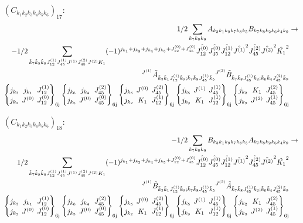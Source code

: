 \documentclass[11pt]{article}
\newcommand{\sixj}[6]{\begingroup\setlength{\arraycolsep}{0.2em}\begin{Bmatrix} #1 & #2 & #3 \\ #4 & #5 & #6 \end{Bmatrix}_{\text{6j}}\endgroup}
\begin{document}
$\left({C}_{{k}_{1}{k}_{2}{k}_{3}{k}_{4}{k}_{5}{k}_{6}}\right)_{17}$:
\begin{align}
1/2\sum_{{k}_{7}{k}_{8}{k}_{9}}{A}_{{k}_{3}{k}_{1}{k}_{9}{k}_{7}{k}_{8}{k}_{5}}{B}_{{k}_{7}{k}_{8}{k}_{2}{k}_{6}{k}_{4}{k}_{9}}&\rightarrow \notag \\-1/2\sum_{\tilde{k}_{7}\tilde{k}_{8}\tilde{k}_{9}J^{(1)}_{12}J^{(1)}_{45}J^{(1)}J^{(2)}_{45}J^{(2)}K_{1}}(-1)^{j_{{k}_{1}} +j_{{k}_{2}} +j_{{k}_{4}} +j_{{k}_{5}} +J^{(0)}_{12} +J^{(0)}_{45} }\hat{J^{(0)}_{12}}\hat{J^{(0)}_{45}}\hat{J^{(1)}_{12}}\hat{J^{(1)}}^{2}\hat{J^{(2)}_{45}}\hat{J^{(2)}}^{2}\hat{K_{1}}^{2}& \notag \\{}^{J^{(1)}}\tilde{A}_{\tilde{k}_{3}\tilde{k}_{1}J^{(1)}_{12}\tilde{k}_{9};\tilde{k}_{7}\tilde{k}_{8}J^{(1)}_{45}\tilde{k}_{5}}{}^{J^{(2)}}\tilde{B}_{\tilde{k}_{7}\tilde{k}_{8}J^{(1)}_{45}\tilde{k}_{2};\tilde{k}_{6}\tilde{k}_{4}J^{(2)}_{45}\tilde{k}_{9}}& \notag \\\sixj{j_{{k}_{3}}}{j_{{k}_{1}}}{J^{(1)}_{12}}{j_{{k}_{2}}}{J^{(0)}}{J^{(0)}_{12}}\sixj{j_{{k}_{6}}}{j_{{k}_{4}}}{J^{(2)}_{45}}{j_{{k}_{5}}}{J^{(0)}}{J^{(0)}_{45}}\sixj{j_{{k}_{5}}}{J^{(0)}}{J^{(2)}_{45}}{j_{{k}_{2}}}{K_{1}}{J^{(1)}_{12}}\sixj{j_{{k}_{5}}}{J^{(1)}}{J^{(1)}_{45}}{j_{{k}_{9}}}{K_{1}}{J^{(1)}_{12}}\sixj{j_{{k}_{2}}}{K_{1}}{J^{(2)}_{45}}{j_{{k}_{9}}}{J^{(2)}}{J^{(1)}_{45}}
\end{align}

$\left({C}_{{k}_{1}{k}_{2}{k}_{3}{k}_{4}{k}_{5}{k}_{6}}\right)_{18}$:
\begin{align}
-1/2\sum_{{k}_{7}{k}_{8}{k}_{9}}{B}_{{k}_{3}{k}_{1}{k}_{9}{k}_{7}{k}_{8}{k}_{5}}{A}_{{k}_{7}{k}_{8}{k}_{2}{k}_{6}{k}_{4}{k}_{9}}&\rightarrow \notag \\1/2\sum_{\tilde{k}_{7}\tilde{k}_{8}\tilde{k}_{9}J^{(1)}_{12}J^{(1)}_{45}J^{(1)}J^{(2)}_{45}J^{(2)}K_{1}}(-1)^{j_{{k}_{1}} +j_{{k}_{2}} +j_{{k}_{4}} +j_{{k}_{5}} +J^{(0)}_{12} +J^{(0)}_{45} }\hat{J^{(0)}_{12}}\hat{J^{(0)}_{45}}\hat{J^{(1)}_{12}}\hat{J^{(1)}}^{2}\hat{J^{(2)}_{45}}\hat{J^{(2)}}^{2}\hat{K_{1}}^{2}& \notag \\{}^{J^{(1)}}\tilde{B}_{\tilde{k}_{3}\tilde{k}_{1}J^{(1)}_{12}\tilde{k}_{9};\tilde{k}_{7}\tilde{k}_{8}J^{(1)}_{45}\tilde{k}_{5}}{}^{J^{(2)}}\tilde{A}_{\tilde{k}_{7}\tilde{k}_{8}J^{(1)}_{45}\tilde{k}_{2};\tilde{k}_{6}\tilde{k}_{4}J^{(2)}_{45}\tilde{k}_{9}}& \notag \\\sixj{j_{{k}_{3}}}{j_{{k}_{1}}}{J^{(1)}_{12}}{j_{{k}_{2}}}{J^{(0)}}{J^{(0)}_{12}}\sixj{j_{{k}_{6}}}{j_{{k}_{4}}}{J^{(2)}_{45}}{j_{{k}_{5}}}{J^{(0)}}{J^{(0)}_{45}}\sixj{j_{{k}_{5}}}{J^{(0)}}{J^{(2)}_{45}}{j_{{k}_{2}}}{K_{1}}{J^{(1)}_{12}}\sixj{j_{{k}_{5}}}{J^{(1)}}{J^{(1)}_{45}}{j_{{k}_{9}}}{K_{1}}{J^{(1)}_{12}}\sixj{j_{{k}_{2}}}{K_{1}}{J^{(2)}_{45}}{j_{{k}_{9}}}{J^{(2)}}{J^{(1)}_{45}}
\end{align}
\end{document}
